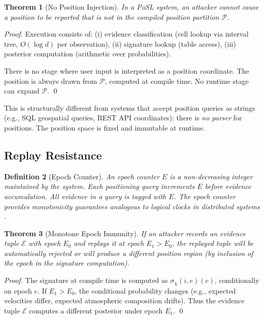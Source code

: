 \documentclass[twocolumn,10pt]{article}
\newtheorem{theorem}{Theorem}[section]
\newtheorem{definition}[theorem]{Definition}
\newcommand{\calP}{\mathcal{P}}     %
\begin{document}
\begin{theorem}[No Position Injection]
\label{thm:no-inject}
In a PoSL system, an attacker cannot cause a position to be reported
that is not in the compiled position partition $\calP$.
\end{theorem}

\begin{proof}
Execution consists of: (i) evidence classification (cell lookup via interval
tree, $O(\log d)$ per observation), (ii) signature lookup (table access),
(iii) posterior computation (arithmetic over probabilities).

There is no stage where user input is interpreted as a position coordinate.
The position is always drawn from $\calP$, computed at compile time.
No runtime stage can expand $\calP$.
\qed
\end{proof}

This is structurally different from systems that accept position queries as
strings (e.g., SQL geospatial queries, REST API coordinates): there is
\emph{no parser} for positions. The position space is fixed and immutable
at runtime.

\subsection{Replay Resistance}

\begin{definition}[Epoch Counter]
\label{def:epoch}
An \emph{epoch counter} $E$ is a non-decreasing integer maintained by the
system. Each positioning query increments $E$ before evidence accumulation.
All evidence in a query is tagged with $E$. The epoch counter provides
monotonicity guarantees analogous to logical clocks in distributed systems \cite{lamport1978clocks,mattern1989virtualtime}.
\end{definition}

\begin{theorem}[Monotone Epoch Immunity]
\label{thm:replay}
If an attacker records an evidence tuple $\mathcal{E}$ with epoch $E_0$ and
replays it at epoch $E_1 > E_0$, the replayed tuple will be automatically
rejected or will produce a different position region (by inclusion of the
epoch in the signature computation).
\end{theorem}

\begin{proof}
The signature at compile time is computed as $\sigma_\chi(i, e)(c)$,
conditionally on epoch $e$. If $E_1 > E_0$, the conditional probability
changes (e.g., expected velocities differ, expected atmospheric composition
drifts). Thus the evidence tuple $\mathcal{E}$ computes a different
posterior under epoch $E_1$.
\qed
\end{proof}
\end{document}
